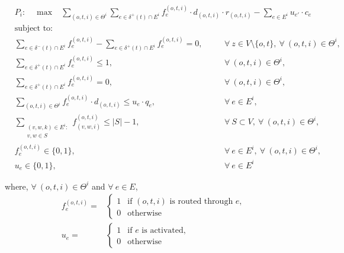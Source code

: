 \documentclass[review]{elsarticle}
\begin{document}
    \begin{align}
        &  P_i: \quad \max  &  \sum_{(o,t,i)\in \Theta^i} \sum_{e \in \delta^+(t)\cap E^i} f_e^{(o,t,i)} \cdot d_{(o,t,i)} \cdot r_{(o,t,i)} - \sum_{e\in E^i} u_{e'}\cdot c_{e} \hspace{20pt} &&   \label{eq:SingleAgentA}
    \end{align}
    \begin{align}
        & \text{subject to:}       &  \nonumber\\
       & \sum_{e \in \delta^-(t)\cap E^i} f_e^{(o,t,i)}-\sum_{e \in \delta^+(t)\cap E^i} f_{e}^{(o,t,i)} = 0,\quad && \forall\ z\in V\setminus\{o,t\},\ \forall\ (o,t,i)\in\Theta^i,  \label{eq:SingleAgentB}\\
        &    \sum_{e \in \delta^+(t)\cap E^i} f_e^{(o,t,i)} \leq 1,  && \forall\ (o,t,i)\in \Theta^i, \label{eq:SingleAgentC} \\
		& \sum_{e \in \delta^+(t)\cap E^i} f_e^{(o,t,i)}= 0,  && \forall\ (o,t,i)\in \Theta^i, \label{eq:SingleAgentD} \\
		& \sum_{(o,t,i) \in \Theta^i} f_e^{(o,t,i)}\cdot d_{(o,t,i)} \leq u_e\cdot q_e, && \forall\ e \in E^i,\label{eq:SingleAgentE}  \\
		& \sum_{\substack{(v,w,k) \in E^i\colon \\ v,w \in S}} f_{(v,w,i)}^{(o,t,i)} \leq |S| -1,   && \forall\ S \subset V,\ \forall\ (o,t,i) \in \Theta^i, \label{eq:SingleAgentF}\\[1em]
		& f_e^{(o,t,i)} \in \{0,1\},    && \forall\ e \in E^i,\ \forall\ (o,t,i) \in \Theta^i, \label{eq:SingleAgentG} \\ 
		&  u_e   \in \{0,1\},           && \forall\ e \in E^i 
    \end{align}

where, $\forall\ (o,t,i)\in \Theta^i$ and  $\forall\ e \in E$,
\[
\begin{array}{rl}
f_e^{(o,t,i)} = & \begin{cases}
    1 & \text{if } (o,t,i) \text{ is routed through } e,\\
    0 & \text{otherwise}
\end{cases}  \\[20pt]
u_e = &\begin{cases}
    1 & \text{if } e \text{ is activated},\\
    0 & \text{otherwise}    
\end{cases}
\end{array}
\]
\end{document}
